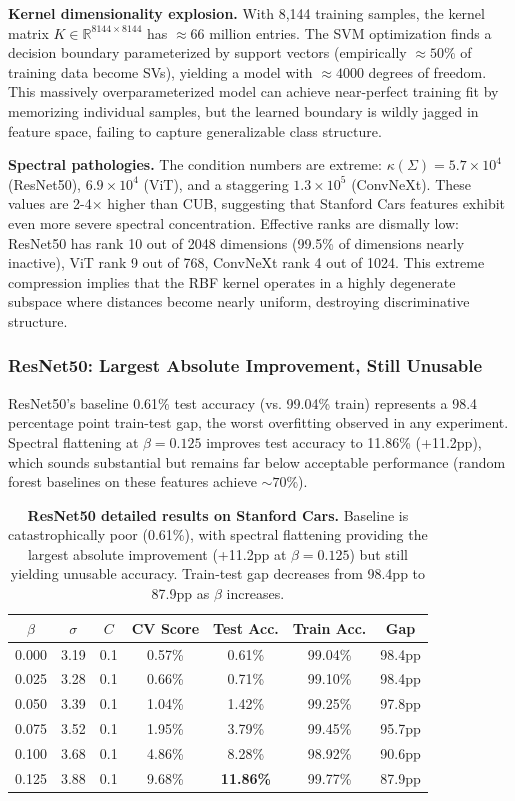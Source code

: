 \documentclass[11pt]{article}
\begin{document}
\textbf{Kernel dimensionality explosion.} With 8,144 training samples, the kernel matrix $K \in \mathbb{R}^{8144 \times 8144}$ has $\approx 66$ million entries. The SVM optimization finds a decision boundary parameterized by support vectors (empirically $\approx 50\%$ of training data become SVs), yielding a model with $\approx 4000$ degrees of freedom. This massively overparameterized model can achieve near-perfect training fit by memorizing individual samples, but the learned boundary is wildly jagged in feature space, failing to capture generalizable class structure.

\textbf{Spectral pathologies.} The condition numbers are extreme: $\kappa(\Sigma) = 5.7 \times 10^4$ (ResNet50), $6.9 \times 10^4$ (ViT), and a staggering $1.3 \times 10^5$ (ConvNeXt). These values are 2-4$\times$ higher than CUB, suggesting that Stanford Cars features exhibit even more severe spectral concentration. Effective ranks are dismally low: ResNet50 has rank 10 out of 2048 dimensions (99.5\% of dimensions nearly inactive), ViT rank 9 out of 768, ConvNeXt rank 4 out of 1024. This extreme compression implies that the RBF kernel operates in a highly degenerate subspace where distances become nearly uniform, destroying discriminative structure.

\subsubsection{ResNet50: Largest Absolute Improvement, Still Unusable}

ResNet50's baseline 0.61\% test accuracy (vs. 99.04\% train) represents a 98.4 percentage point train-test gap, the worst overfitting observed in any experiment. Spectral flattening at $\beta=0.125$ improves test accuracy to 11.86\% (+11.2pp), which sounds substantial but remains far below acceptable performance (random forest baselines on these features achieve $\sim 70\%$).

\begin{table}[h]
\centering
\caption{\textbf{ResNet50 detailed results on Stanford Cars.} Baseline is catastrophically poor (0.61\%), with spectral flattening providing the largest absolute improvement (+11.2pp at $\beta=0.125$) but still yielding unusable accuracy. Train-test gap decreases from 98.4pp to 87.9pp as $\beta$ increases.}
\label{tab:cars_resnet50_detail}
\begin{tabular}{ccccccc}
\toprule
$\beta$ & $\sigma$ & $C$ & CV Score & Test Acc. & Train Acc. & Gap \\
\midrule
0.000 & 3.19 & 0.1 & 0.57\% & 0.61\% & 99.04\% & 98.4pp \\
0.025 & 3.28 & 0.1 & 0.66\% & 0.71\% & 99.10\% & 98.4pp \\
0.050 & 3.39 & 0.1 & 1.04\% & 1.42\% & 99.25\% & 97.8pp \\
0.075 & 3.52 & 0.1 & 1.95\% & 3.79\% & 99.45\% & 95.7pp \\
0.100 & 3.68 & 0.1 & 4.86\% & 8.28\% & 98.92\% & 90.6pp \\
0.125 & 3.88 & 0.1 & 9.68\% & \textbf{11.86\%} & 99.77\% & 87.9pp \\
\bottomrule
\end{tabular}
\end{table}
\end{document}
